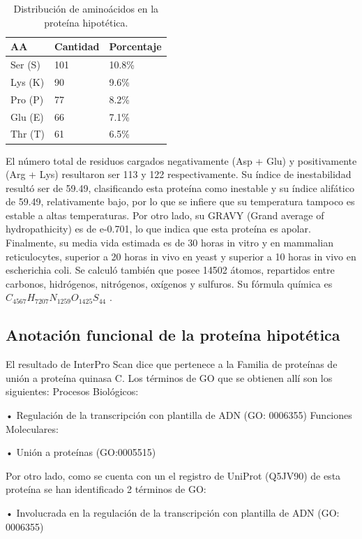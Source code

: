 \documentclass[journal,transmag]{IEEEtran}
\begin{document}
\begin{table}[htb]
	\begin{tabular}{|l|l|l|}
	\hline
	 AA& Cantidad  &Porcentaje  \\ \hline
	 Ser (S) & 101  & 10.8\%  \\ \hline
	 Lys (K) & 90  & 9.6\%  \\ \hline
	 Pro (P) & 77  & 8.2\%  \\ \hline
	 Glu (E) & 66  & 7.1\%  \\ \hline
	 Thr (T) & 61  & 6.5\%  \\ \hline
	\end{tabular}
	\caption{Distribución de aminoácidos en la proteína hipotética.  }
	\end{table}
	El número total de residuos cargados negativamente (Asp + Glu) y positivamente (Arg + Lys) resultaron ser 113 y 122 respectivamente. Su índice de inestabilidad resultó ser de 59.49, clasificando esta proteína como inestable y su índice alifático de 59.49, relativamente bajo, por lo que se infiere que su temperatura tampoco es estable a altas temperaturas. Por otro lado, su GRAVY (Grand average of hydropathicity) es de e-0.701, lo que indica que esta proteína es apolar. Finalmente, su media vida estimada es de 30 horas in vitro y en mammalian reticulocytes, superior a 20 horas in vivo en yeast y superior a 10 horas in vivo en escherichia coli. 
	Se calculó también que posee 14502 átomos, repartidos entre carbonos, hidrógenos, nitrógenos, oxígenos y sulfuros. Su fórmula química es $C_{4567} H_{7207} N_{1259} O_{1425} S_{44}$ . 
	

\subsection{\textbf{ Anotación funcional de la proteína hipotética}}

El resultado de InterPro Scan dice que pertenece a la Familia de proteínas de unión a proteína quinasa C. 
Los términos de GO que se obtienen allí son los siguientes:
Procesos Biológicos:

    • Regulación de la transcripción con plantilla de ADN (GO: 0006355)
Funciones Moleculares:

    • Unión a proteínas (GO:0005515)


Por otro lado, como se cuenta con un el registro de UniProt (Q5JV90) de esta proteína se han identificado 2 términos de GO:

    • Involucrada en la regulación de la transcripción con plantilla de ADN (GO: 0006355)
\end{document}
